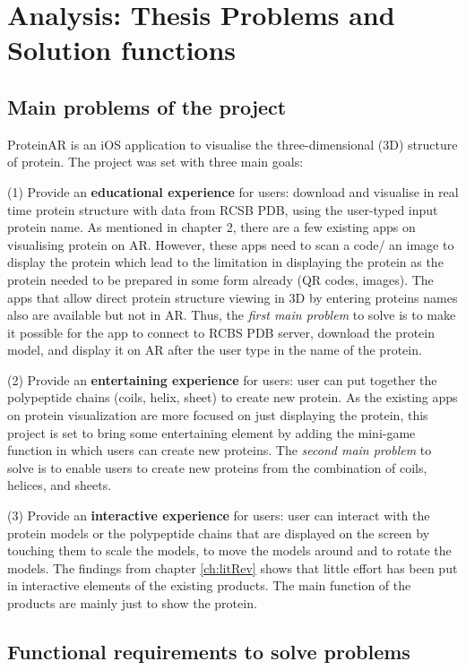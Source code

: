 \chapter{Analysis: Thesis Problems and Solution functions}
\label{ch:analysis2}

\section{Main problems of the project}
ProteinAR is an iOS application to visualise the three-dimensional (3D) structure of protein. The project was set with three main goals:

(1) Provide an \textbf{educational experience} for users: download and visualise in real time protein structure with data from RCSB PDB, using the user-typed input protein name. As mentioned in chapter 2, there are a few existing apps on visualising protein on AR. However, these apps need to scan a code/ an image to display the protein which lead to the limitation in displaying the protein as the protein needed to be prepared in some form already (QR codes, images). The apps that allow direct protein structure viewing in 3D by entering proteins names also are available but not in AR. 
Thus, the \emph{first main problem} to solve is to make it possible for the app to connect to RCBS PDB server, download the protein model, and display it on AR after the user type in the name of the protein. 

(2) Provide an \textbf{entertaining experience} for users: user can put together the polypeptide chains (coils, helix, sheet) to create new protein. As the existing apps on protein visualization are more focused on just displaying the protein, this project is set to bring some entertaining element by adding the mini-game function in which users can create new proteins. 
The \emph{second main problem} to solve is to enable users to create new proteins from the combination of coils, helices, and sheets. 

(3) Provide an \textbf{interactive experience} for users: user can interact with the protein models or the polypeptide chains that are displayed on the screen by touching them to scale the models, to move the models around and to rotate the models. The findings from chapter \ref{ch:litRev} shows that little effort has been put in interactive elements of the existing products. The main function of the products are mainly just to show the protein. 

\section{Functional requirements to solve problems}
